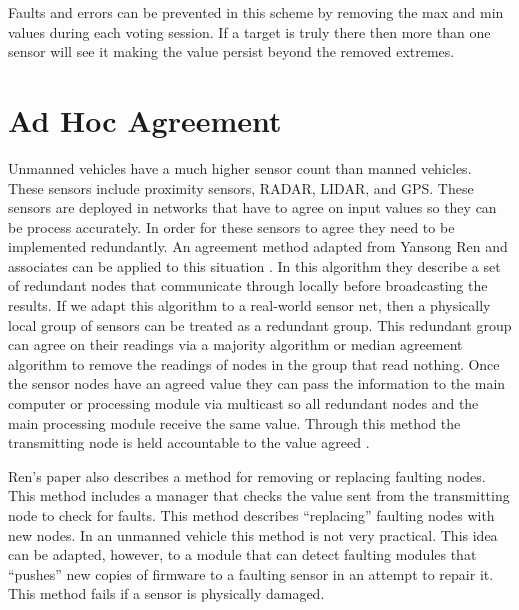 \documentclass[twoside, conference]{IEEEtran}%
\begin{document}
Faults and errors can be prevented in this scheme by removing the max and min values during each voting session. If a target is truly there then more than one sensor will see it making the value persist beyond the removed extremes.

\section{Ad Hoc Agreement}\label{sec:adhoc-agreement}
Unmanned vehicles have a much higher sensor count than manned vehicles. These sensors include proximity sensors, RADAR, LIDAR, and GPS. These sensors are deployed in networks that have to agree on input values so they can be process accurately. In order for these sensors to agree they need to be implemented redundantly. An agreement method adapted from Yansong Ren and associates can be applied to this situation \cite{Ren2001}. In this algorithm they describe a set of redundant nodes that communicate through locally before broadcasting the results. If we adapt this algorithm to a real-world sensor net, then a physically local group of sensors can be treated as a redundant group. This redundant group can agree on their readings via a majority algorithm or median agreement algorithm to remove the readings of nodes in the group that read nothing. Once the sensor nodes have an agreed value they can pass the information to the main computer or processing module via multicast so all redundant nodes and the main processing module receive the same value. Through this method the transmitting node is held accountable to the value agreed \cite{Ren2001}.

Ren's paper also describes a method for removing or replacing faulting nodes. This method includes a manager that checks the value sent from the transmitting node to check for faults. This method describes ``replacing'' faulting nodes with new nodes. In an unmanned vehicle this method is not very practical. This idea can be adapted, however, to a module that can detect faulting modules that ``pushes'' new copies of firmware to a faulting sensor in an attempt to repair it. This method fails if a sensor is physically damaged.\cite{Ren2001}
\end{document}
